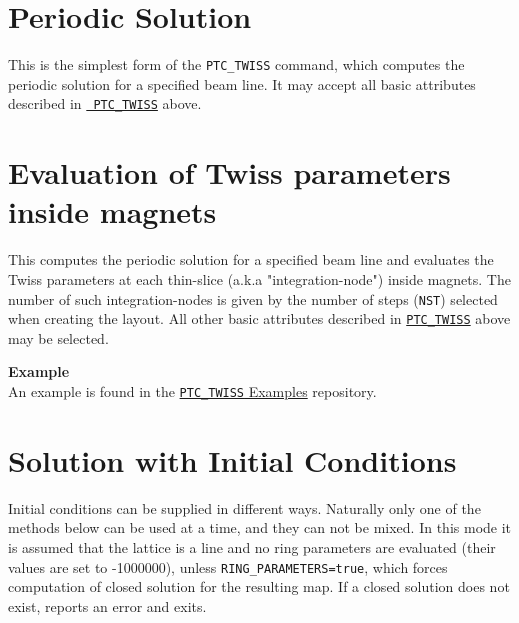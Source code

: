 \section{Periodic Solution}
\label{sec:ptc_twiss_periodic}	

This is the simplest form of the {\tt PTC\_TWISS} command, which
computes the periodic solution for a specified beam line. It may
accept all basic attributes described in \hyperref[sec:ptc_twiss]{\tt
  PTC\_TWISS} above.



\section{Evaluation of Twiss parameters inside magnets}
\label{sec:ptc_twiss_slicing}

This computes the periodic solution for a specified beam
line and evaluates the Twiss parameters at each thin-slice
(a.k.a "integration-node") inside magnets. The number of such
integration-nodes is given by the number of steps ({\tt NST})
selected when creating the \ptc layout. All other basic
attributes described in \hyperref[sec:ptc_twiss]{\tt PTC\_TWISS} above
may be selected.



{\bf Example} \\
An example is found in the
\href{http://madx.web.cern.ch/madx/madX/examples/ptc_twiss/SliceMagnets/}
{{\tt PTC\_TWISS} Examples} repository. 



\section{Solution with Initial Conditions}
\label{sec:ptc_twiss_sol_initial_cond}


Initial conditions can be supplied in different ways.  Naturally only
one of the methods below can be used at a time, and they can not be
mixed.  In this mode it is assumed that the lattice is a line and no
ring parameters are evaluated (their values are set to -1000000), unless
{\tt RING\_PARAMETERS=true}, which forces computation of closed solution
for the resulting map. If a closed solution does not exist, \ptc
reports an error and exits.

